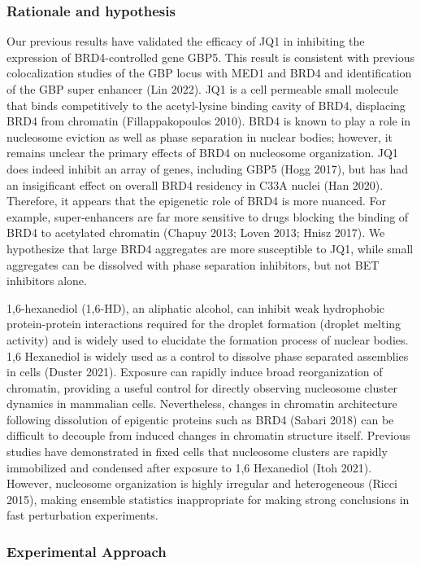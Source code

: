 \documentclass{ucetd}
\begin{document}
\subsubsection{Rationale and hypothesis}

Our previous results have validated the efficacy of JQ1 in inhibiting the expression of BRD4-controlled gene GBP5. This result is consistent with previous colocalization studies of the GBP locus with MED1 and BRD4 and identification of the GBP super enhancer (Lin 2022). JQ1 is a cell permeable small molecule that binds competitively to the acetyl-lysine binding cavity of BRD4, displacing BRD4 from chromatin (Fillappakopoulos 2010). BRD4 is known to play a role in nucleosome eviction as well as phase separation in nuclear bodies; however, it remains unclear the primary effects of BRD4 on nucleosome organization. JQ1 does indeed inhibit an array of genes, including GBP5 (Hogg 2017), but has had an insigificant effect on overall BRD4 residency in C33A nuclei (Han 2020). Therefore, it appears that the epigenetic role of BRD4 is more nuanced. For example, super-enhancers are far more sensitive to drugs blocking the binding of BRD4 to acetylated chromatin (Chapuy 2013; Loven 2013; Hnisz 2017). We hypothesize that large BRD4 aggregates are more susceptible to JQ1, while small aggregates can be dissolved with phase separation inhibitors, but not BET inhibitors alone.

1,6-hexanediol (1,6-HD), an aliphatic alcohol, can inhibit weak hydrophobic protein-protein interactions required for the droplet formation (droplet melting activity) and is widely used to elucidate the formation process of nuclear bodies. 1,6 Hexanediol is widely used as a control to dissolve phase separated assemblies in cells (Duster 2021). Exposure can rapidly induce broad reorganization of chromatin, providing a useful control for directly observing nucleosome cluster dynamics in mammalian cells. Nevertheless, changes in chromatin architecture following dissolution of epigentic proteins such as BRD4 (Sabari 2018) can be difficult to decouple from induced changes in chromatin structure itself. Previous studies have demonstrated in fixed cells that nucleosome clusters are rapidly immobilized and condensed after exposure to 1,6 Hexanediol (Itoh 2021). However, nucleosome organization is highly irregular and heterogeneous (Ricci 2015), making ensemble statistics inappropriate for making strong conclusions in fast perturbation experiments. 

\subsubsection{Experimental Approach}
\end{document}
